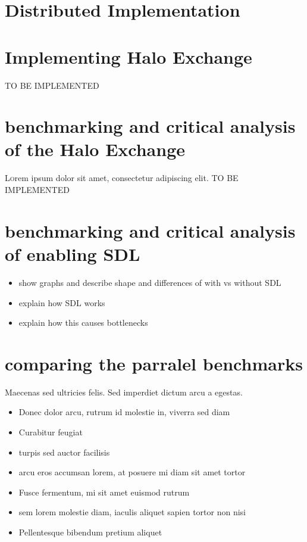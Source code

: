 \documentclass[twoside,twocolumn]{article}
\begin{document}
\section{Distributed Implementation}



\section{Implementing Halo Exchange}

TO BE IMPLEMENTED

\section{benchmarking and critical analysis of the Halo Exchange}

\lettrine[nindent=0em,lines=3]{L} orem ipsum dolor sit amet, consectetur adipiscing elit.
TO BE IMPLEMENTED

\section{benchmarking and critical analysis of enabling SDL}
\begin{itemize}
  \item show graphs and describe shape and differences of with vs without SDL
  \item explain how SDL works
  \item explain how this causes bottlenecks
\end{itemize}

\section{comparing the parralel benchmarks}

Maecenas sed ultricies felis. Sed imperdiet dictum arcu a egestas. 
\begin{itemize}
\item Donec dolor arcu, rutrum id molestie in, viverra sed diam
\item Curabitur feugiat
\item turpis sed auctor facilisis
\item arcu eros accumsan lorem, at posuere mi diam sit amet tortor
\item Fusce fermentum, mi sit amet euismod rutrum
\item sem lorem molestie diam, iaculis aliquet sapien tortor non nisi
\item Pellentesque bibendum pretium aliquet
\end{itemize}
\blindtext %
\end{document}
